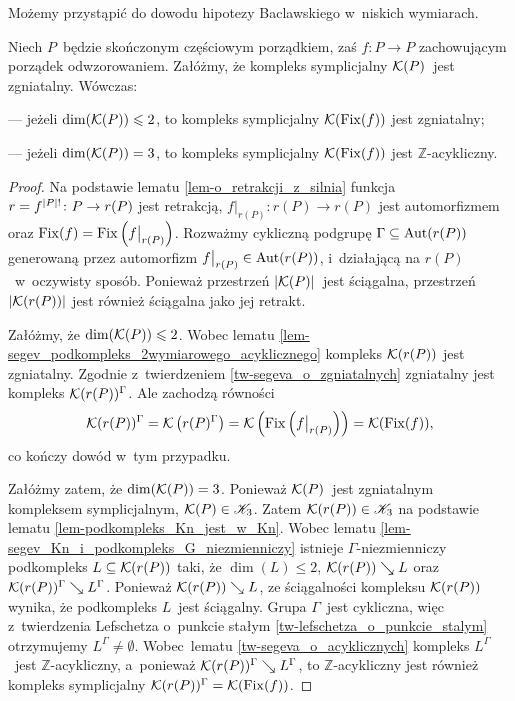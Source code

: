 Możemy przystąpić do dowodu hipotezy Baclawskiego w~niskich wymiarach.

\begin{stw}\label{stw-baclawski_dla_wymiarow_2_i_3}
Niech $P$~będzie skończonym częściowym porządkiem, zaś $f\colon P\to P$ zachowującym porządek odwzorowaniem. Załóżmy, że kompleks symplicjalny $\mathcal{K}(P)$~jest zgniatalny. Wówczas:
\begin{compactitem}
\item[---] jeżeli $\dim(\mathcal{K}(P))\leqslant 2$, to kompleks symplicjalny $\mathcal{K}(\operatorname{Fix}(f))$ jest zgniatalny;
\item[---] jeżeli $\dim(\mathcal{K}(P))= 3$, to kompleks symplicjalny $\mathcal{K}(\operatorname{Fix}(f))$ jest $\mathbb{Z}$-acykliczny.
\end{compactitem}
\end{stw}
\begin{proof}
Na podstawie lematu \ref{lem-o_retrakcji_z_silnia} funkcja $r=f^{\left|P\right|!}\colon P\to r(P)$ jest retrakcją, $f\big|_{r(P)}\colon r(P)\to r(P)$ jest automorfizmem oraz $\operatorname{Fix}(f)=\operatorname{Fix}\left(f\big|_{r(P)}\right)$. Rozważmy cykliczną podgrupę $\Gamma\subseteq \operatorname{Aut}(r(P))$ generowaną przez automorfizm $f\big|_{r(P)}\in \operatorname{Aut}(r(P))$, i~działającą na $r(P)$~w~oczywisty sposób.
Ponieważ przestrzeń $|\mathcal{K}(P)|$~jest ściągalna, przestrzeń $|\mathcal{K}(r(P))|$ jest również ściągalna jako jej retrakt.

Załóżmy, że $\dim(\mathcal{K}(P))\leqslant 2$. Wobec lematu \ref{lem-segev_podkompleks_2wymiarowego_acyklicznego} kompleks $\mathcal{K}(r(P))$ jest zgniatalny. Zgodnie z~twierdzeniem \ref{tw-segeva_o_zgniatalnych} zgniatalny jest kompleks $\mathcal{K}(r(P))^\Gamma$. Ale zachodzą równości \[\mathcal{K}(r(P))^\Gamma=\mathcal{K}\left(r(P)^\Gamma\right)=\mathcal{K}\left(\operatorname{Fix}\left(f\big|_{r(P)}\right)\right)=\mathcal{K}(\operatorname{Fix}(f)),\] co kończy dowód w~tym przypadku.

Załóżmy zatem, że $\dim(\mathcal{K}(P))=3$. Ponieważ $\mathcal{K}(P)$~jest zgniatalnym kompleksem symplicjalnym, $\mathcal{K}(P)\in\mathscr{K}_3$. Zatem $\mathcal{K}(r(P))\in\mathscr{K}_3$ na podstawie lematu \ref{lem-podkompleks_Kn_jest_w_Kn}. Wobec lematu \ref{lem-segev_Kn_i_podkompleks_G_niezmienniczy} istnieje $\Gamma$-niezmienniczy podkompleks $L\subseteq \mathcal{K}(r(P))$ taki, że $\dim(L)\leq 2$, $\mathcal{K}(r(P))\searrow L$ oraz $\mathcal{K}(r(P))^\Gamma\searrow L^\Gamma$.  Ponieważ $\mathcal{K}(r(P))\searrow L$, ze ściągalności kompleksu $\mathcal{K}(r(P))$ wynika, że podkompleks $L$~jest ściągalny. Grupa $\Gamma$~jest  cykliczna, więc z~twierdzenia Lefschetza o~punkcie stałym \ref{tw-lefschetza_o_punkcie_stalym} otrzymujemy $L^\Gamma\not=\emptyset$. Wobec~lematu \ref{tw-segeva_o_acyklicznych} kompleks $L^\Gamma$~jest \mbox{$\mathbb{Z}$-acykliczny}, a~ponieważ $\mathcal{K}(r(P))^\Gamma\searrow L^\Gamma$, to \mbox{$\mathbb{Z}$-acykliczny} jest również kompleks symplicjalny $\mathcal{K}(r(P))^\Gamma=\mathcal{K}(\operatorname{Fix}(f))$.
\end{proof}


